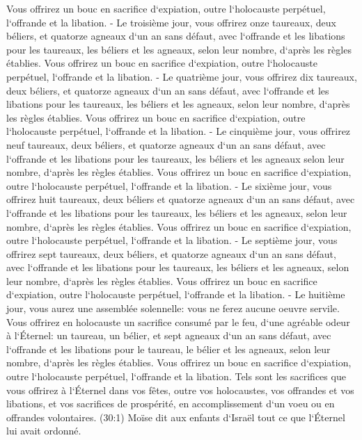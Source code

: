 \verse Vous offrirez un bouc en sacrifice d`expiation, outre l`holocauste perpétuel, l`offrande et la libation. - 
\verse Le troisième jour, vous offrirez onze taureaux, deux béliers, et quatorze agneaux d`un an sans défaut, 
\verse avec l`offrande et les libations pour les taureaux, les béliers et les agneaux, selon leur nombre, d`après les règles établies. 
\verse Vous offrirez un bouc en sacrifice d`expiation, outre l`holocauste perpétuel, l`offrande et la libation. - 
\verse Le quatrième jour, vous offrirez dix taureaux, deux béliers, et quatorze agneaux d`un an sans défaut, 
\verse avec l`offrande et les libations pour les taureaux, les béliers et les agneaux, selon leur nombre, d`après les règles établies. 
\verse Vous offrirez un bouc en sacrifice d`expiation, outre l`holocauste perpétuel, l`offrande et la libation. - 
\verse Le cinquième jour, vous offrirez neuf taureaux, deux béliers, et quatorze agneaux d`un an sans défaut, 
\verse avec l`offrande et les libations pour les taureaux, les béliers et les agneaux selon leur nombre, d`après les règles établies. 
\verse Vous offrirez un bouc en sacrifice d`expiation, outre l`holocauste perpétuel, l`offrande et la libation. - 
\verse Le sixième jour, vous offrirez huit taureaux, deux béliers et quatorze agneaux d`un an sans défaut, 
\verse avec l`offrande et les libations pour les taureaux, les béliers et les agneaux, selon leur nombre, d`après les règles établies. 
\verse Vous offrirez un bouc en sacrifice d`expiation, outre l`holocauste perpétuel, l`offrande et la libation. - 
\verse Le septième jour, vous offrirez sept taureaux, deux béliers, et quatorze agneaux d`un an sans défaut, 
\verse avec l`offrande et les libations pour les taureaux, les béliers et les agneaux, selon leur nombre, d`après les règles établies. 
\verse Vous offrirez un bouc en sacrifice d`expiation, outre l`holocauste perpétuel, l`offrande et la libation. - 
\verse Le huitième jour, vous aurez une assemblée solennelle: vous ne ferez aucune oeuvre servile. 
\verse Vous offrirez en holocauste un sacrifice consumé par le feu, d`une agréable odeur à l`Éternel: un taureau, un bélier, et sept agneaux d`un an sans défaut, 
\verse avec l`offrande et les libations pour le taureau, le bélier et les agneaux, selon leur nombre, d`après les règles établies. 
\verse Vous offrirez un bouc en sacrifice d`expiation, outre l`holocauste perpétuel, l`offrande et la libation. 
\verse Tels sont les sacrifices que vous offrirez à l`Éternel dans vos fêtes, outre vos holocaustes, vos offrandes et vos libations, et vos sacrifices de prospérité, en accomplissement d`un voeu ou en offrandes volontaires. 
\verse (30:1) Moïse dit aux enfants d`Israël tout ce que l`Éternel lui avait ordonné. 

